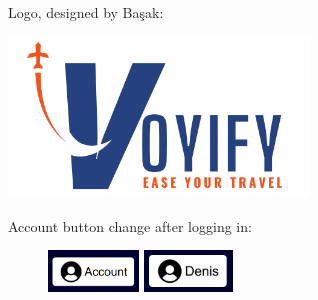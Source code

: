\documentclass[12pt]{article}
\begin{document}
Logo, designed by Başak:
\begin{center}
\includegraphics[width=0.6\textwidth]{./images/voyify-transparent.png}
\end{center}

Account button change after logging in:
\begin{figure}[h] 
\centering
\includegraphics[height=3em]{./images/account_button.png}
\includegraphics[height=3em]{./images/denis_button.png}
\end{figure}
\end{document}
